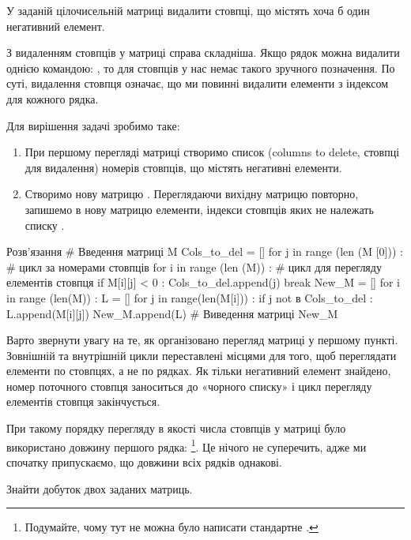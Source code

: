 \begin{pr}{}
У заданій цілочисельній матриці видалити стовпці, що містять хоча б один негативний елемент.
\end{pr}

З видаленням стовпців у матриці справа складніша. Якщо рядок \mi{[i0]} можна видалити однією командою: , то для стовпців у нас немає такого зручного позначення. По суті, видалення стовпця \mi{[j0]} означає, що ми повинні видалити елементи з індексом \mi{[j0]} для кожного рядка.

Для вирішення задачі зробимо таке:
\begin{enumerate}
\item При першому перегляді матриці  створимо список  (columns to delete, стовпці для видалення) номерів стовпців, що містять негативні елементи.
\item Створимо нову матрицю . Переглядаючи вихідну матрицю  повторно, запишемо в нову матрицю елементи, індекси стовпців яких не належать списку .
\end{enumerate}

\begin{py}{Розв'язання}
# Введення матриці M
Cols_to_del = []
for j in range (len (M [0])) : # цикл за номерами стовпців
    for i in range (len (M)) : # цикл для перегляду елементів стовпця
        if M[i][j] < 0 :
            Cols_to_del.append(j)
            break
New_M = []
for i in range (len(M)) :
    L = []
    for j in range(len(M[i])) :
        if j not в Cols_to_del :
            L.append(M[i][j])
    New_M.append(L)
# Виведення матриці New_M
\end{py}
\noindent Варто звернути увагу на те, як організовано перегляд матриці  у першому пункті. Зовнішній та внутрішній цикли переставлені місцями для того, щоб переглядати елементи по стовпцях, а не по рядках. Як тільки негативний елемент знайдено, номер поточного стовпця заноситься до «чорного списку» і цикл перегляду елементів стовпця закінчується.

При такому порядку перегляду в якості числа стовпців у матриці було використано довжину першого рядка: \footnote{Подумайте, чому тут не можна було написати стандартне .}. Це нічого не суперечить, адже ми спочатку припускаємо, що довжини всіх рядків однакові.

\begin{pr}{}
Знайти добуток двох заданих матриць.
\end{pr}

